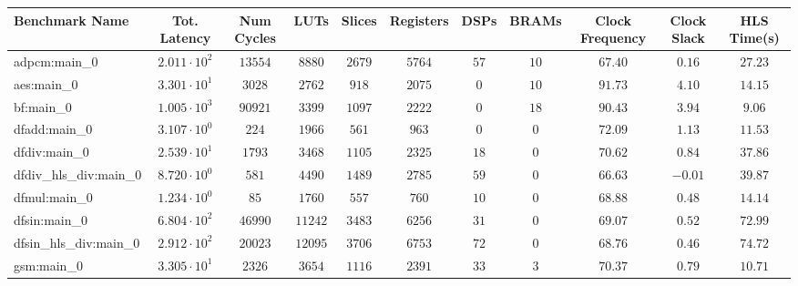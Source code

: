 \begin{tabular}{|l|c|c|c|c|c|c|c|c|c|c|}
\hline
Benchmark Name          & Tot. Latency           & Num Cycles & LUTs      & Slices    & Registers & DSPs    & BRAMs   & Clock Frequency & Clock Slack & HLS Time(s) \\
\hline
adpcm:main\_0           & $ 2.011 \cdot 10^{2} $ & $ 13554  $ & $ 8880  $ & $ 2679  $ & $ 5764  $ & $ 57  $ & $ 10  $ & $ 67.40       $ & $ 0.16    $ & $ 27.23   $ \\
aes:main\_0             & $ 3.301 \cdot 10^{1} $ & $ 3028   $ & $ 2762  $ & $ 918   $ & $ 2075  $ & $ 0   $ & $ 10  $ & $ 91.73       $ & $ 4.10    $ & $ 14.15   $ \\
bf:main\_0              & $ 1.005 \cdot 10^{3} $ & $ 90921  $ & $ 3399  $ & $ 1097  $ & $ 2222  $ & $ 0   $ & $ 18  $ & $ 90.43       $ & $ 3.94    $ & $ 9.06    $ \\
dfadd:main\_0           & $ 3.107 \cdot 10^{0} $ & $ 224    $ & $ 1966  $ & $ 561   $ & $ 963   $ & $ 0   $ & $ 0   $ & $ 72.09       $ & $ 1.13    $ & $ 11.53   $ \\
dfdiv:main\_0           & $ 2.539 \cdot 10^{1} $ & $ 1793   $ & $ 3468  $ & $ 1105  $ & $ 2325  $ & $ 18  $ & $ 0   $ & $ 70.62       $ & $ 0.84    $ & $ 37.86   $ \\
dfdiv\_hls\_div:main\_0 & $ 8.720 \cdot 10^{0} $ & $ 581    $ & $ 4490  $ & $ 1489  $ & $ 2785  $ & $ 59  $ & $ 0   $ & $ 66.63       $ & $ -0.01   $ & $ 39.87   $ \\
dfmul:main\_0           & $ 1.234 \cdot 10^{0} $ & $ 85     $ & $ 1760  $ & $ 557   $ & $ 760   $ & $ 10  $ & $ 0   $ & $ 68.88       $ & $ 0.48    $ & $ 14.14   $ \\
dfsin:main\_0           & $ 6.804 \cdot 10^{2} $ & $ 46990  $ & $ 11242 $ & $ 3483  $ & $ 6256  $ & $ 31  $ & $ 0   $ & $ 69.07       $ & $ 0.52    $ & $ 72.99   $ \\
dfsin\_hls\_div:main\_0 & $ 2.912 \cdot 10^{2} $ & $ 20023  $ & $ 12095 $ & $ 3706  $ & $ 6753  $ & $ 72  $ & $ 0   $ & $ 68.76       $ & $ 0.46    $ & $ 74.72   $ \\
gsm:main\_0             & $ 3.305 \cdot 10^{1} $ & $ 2326   $ & $ 3654  $ & $ 1116  $ & $ 2391  $ & $ 33  $ & $ 3   $ & $ 70.37       $ & $ 0.79    $ & $ 10.71   $ \\

\end{tabular}
